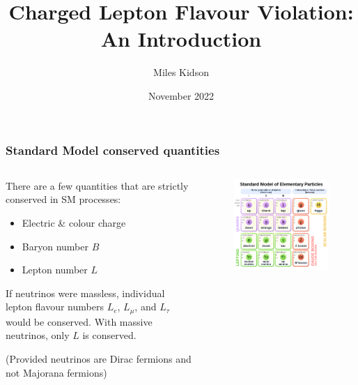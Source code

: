 \documentclass[11pt]{beamer}
\title[Charged Lepton Flavour Violation]{Charged Lepton Flavour Violation: \\ An Introduction} %
\author[Miles Kidson]{Miles Kidson} %
\institute[UCT]{University of Cape Town \\ \smallskip \textit{kdsmil001@myuct.ac.za}} %
\date[November 2022]{November 2022} %
\begin{document}
\frame[plain]{\titlepage}

\begin{frame}
    \frametitle{Standard Model conserved quantities}
    \begin{columns}[c]
        \begin{column}{0.6\textwidth}
            There are a few quantities that are strictly conserved in SM processes:
            \bigskip
            \begin{itemize}
                \item Electric \& colour charge
                \item Baryon number $B$
                \item Lepton number $L$
            \end{itemize}
            \bigskip
            If neutrinos were massless, individual lepton flavour numbers $L_e$, $L_\mu$, and $L_\tau$ would be conserved. With massive neutrinos, only $L$ is conserved.

            (Provided neutrinos are Dirac fermions and not Majorana fermions)

        \end{column}
        \begin{column}{0.4\textwidth}
            \begin{figure}[h]
                \begin{center}
                    \includegraphics[width=\textwidth]{SM.png}
                \end{center}
            \end{figure}
            
        \end{column}
        
    \end{columns}

    

\end{frame}
\end{document}
